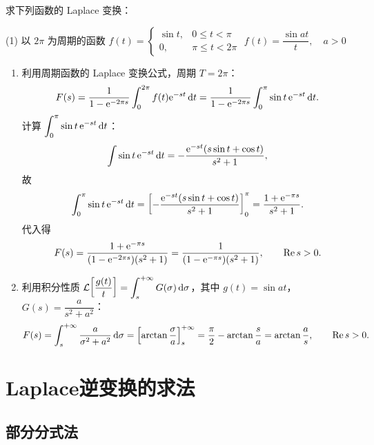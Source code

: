 \documentclass[12pt, a4paper, oneside, UTF8]{ctexbook}
\begin{document}
\begin{example}
    求下列函数的 Laplace 变换：
    \begin{tasks}[label=(\arabic*)](1)
        \task 以 $2\pi$ 为周期的函数 $f(t) = \begin{cases}
            \sin t, & 0\le t < \pi\\
            0, & \pi \le t < 2\pi
        \end{cases}$
        \task $f(t) = \dfrac{\sin at}{t},\quad a > 0$
    \end{tasks}
\end{example}
\begin{solution}
    \begin{enumerate}[label=(\arabic*)]
        \item 利用周期函数的 Laplace 变换公式，周期 $T=2\pi$：
        \[
        F(s) = \frac{1}{1-\mathrm{e}^{-2\pi s}}\int_0^{2\pi} f(t)\mathrm{e}^{-st}\,\mathrm{d} t
        = \frac{1}{1-\mathrm{e}^{-2\pi s}}\int_0^{\pi} \sin t\,\mathrm{e}^{-st}\,\mathrm{d} t.
        \]
        计算 $\displaystyle\int_0^{\pi} \sin t\,\mathrm{e}^{-st}\,\mathrm{d} t$：
        \[
        \int \sin t\,\mathrm{e}^{-st}\,\mathrm{d} t = -\frac{\mathrm{e}^{-st}(s\sin t+\cos t)}{s^2+1},
        \]
        故
        \[
        \int_0^{\pi} \sin t\,\mathrm{e}^{-st}\,\mathrm{d} t
        = \left[-\frac{\mathrm{e}^{-st}(s\sin t+\cos t)}{s^2+1}\right]_0^{\pi}
        = \frac{1+\mathrm{e}^{-\pi s}}{s^2+1}.
        \]
        代入得
        \[
        F(s) = \frac{1+\mathrm{e}^{-\pi s}}{(1-\mathrm{e}^{-2\pi s})(s^2+1)}
        = \frac{1}{(1-\mathrm{e}^{-\pi s})(s^2+1)},\qquad \Re s>0.
        \]

        \item 利用积分性质 $\displaystyle\mathcal{L}\!\left[\frac{g(t)}{t}\right]=\int_s^{+\infty}G(\sigma)\,\mathrm{d}\sigma$，其中 $g(t)=\sin at$，$G(s)=\dfrac{a}{s^2+a^2}$：
        \[
        F(s) = \int_s^{+\infty} \frac{a}{\sigma^2+a^2}\,\mathrm{d}\sigma
        = \left[\arctan\frac{\sigma}{a}\right]_s^{+\infty}
        = \frac{\pi}{2}-\arctan\frac{s}{a}
        = \arctan\frac{a}{s},\qquad \Re s>0.
        \]
    \end{enumerate}
\end{solution}

\section{Laplace逆变换的求法}

\subsection{部分分式法}
\end{document}
